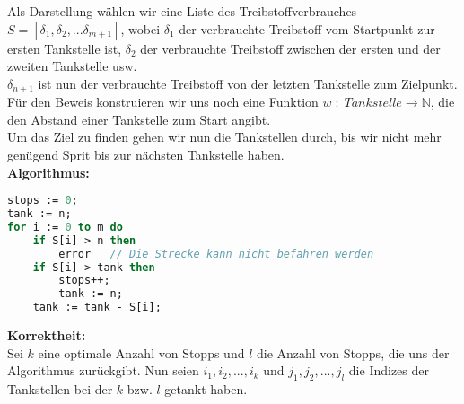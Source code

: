 \documentclass[11pt,a4paper,ngerman]{article}
\begin{document}
Als Darstellung wählen wir eine Liste des Treibstoffverbrauches $S = [\delta_1 , \delta_2 , ... \delta_{m+1}]$, wobei $\delta_1$ der verbrauchte Treibstoff vom Startpunkt zur ersten Tankstelle ist, $\delta_2$ der verbrauchte Treibstoff zwischen der ersten und der zweiten Tankstelle usw.\\
$\delta_{n+1}$ ist nun der verbrauchte Treibstoff von der letzten Tankstelle zum Zielpunkt.\\

Für den Beweis konstruieren wir uns noch eine Funktion $w \; : \; Tankstelle \longrightarrow \mathbb{N}$, die den Abstand einer Tankstelle zum Start angibt.\\


Um das Ziel zu finden gehen wir nun die Tankstellen durch, bis wir nicht mehr genügend Sprit bis zur nächsten Tankstelle haben.\\

\textbf{Algorithmus:}
\begin{lstlisting}[language=Pascal]
stops := 0;
tank := n;
for i := 0 to m do
	if S[i] > n then
		error	// Die Strecke kann nicht befahren werden
	if S[i] > tank then
		stops++;
		tank := n;
	tank := tank - S[i];		
\end{lstlisting}

\textbf{Korrektheit:}\\

Sei $k$ eine optimale Anzahl von Stopps und $l$ die Anzahl von Stopps, die uns der Algorithmus zurückgibt. Nun seien $i_1 , i_2 , ..., i_k$ und $j_1 , j_2 , ... , j_l$ die Indizes der Tankstellen bei der $k$ bzw. $l$ getankt haben.\\
\end{document}
